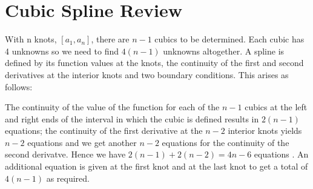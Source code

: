 \section{ Cubic Spline Review }

With n knots, $[a_1,a_n]$, there are $n-1$ cubics to be determined. Each cubic
has 4 unknowns so we need to find $4(n-1)$ unknowns altogether. A spline is
defined by its function values at the knots, the continuity of the first and
second derivatives at the interior knots and two boundary conditions.  This
arises as follows:

The continuity of the value of the function for each of the $n-1$ cubics at the
left and right ends of the interval in which the cubic is defined results in
$2(n-1)$ equations; the continuity of the first derivative at the $n-2$ interior
knots yields $n-2$ equations and we get  another $n-2$ equations for the
continuity of the second derivatve. Hence we have $2(n-1) +2(n-2) = 4n-6$
equations . An additional equation is given at the first knot and at the last
knot to get a total of $4(n-1)$ as required.

